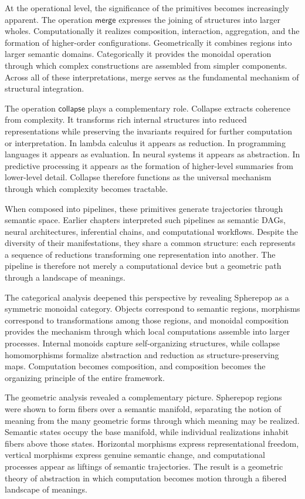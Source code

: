 \documentclass[12pt,letterpaper]{article}
\theoremstyle{remark}
\begin{document}
At the operational level, the significance of the primitives becomes increasingly apparent. The operation $\mathsf{merge}$ expresses the joining of structures into larger wholes. Computationally it realizes composition, interaction, aggregation, and the formation of higher-order configurations. Geometrically it combines regions into larger semantic domains. Categorically it provides the monoidal operation through which complex constructions are assembled from simpler components. Across all of these interpretations, merge serves as the fundamental mechanism of structural integration.

The operation $\mathsf{collapse}$ plays a complementary role. Collapse extracts coherence from complexity. It transforms rich internal structures into reduced representations while preserving the invariants required for further computation or interpretation. In lambda calculus it appears as reduction. In programming languages it appears as evaluation. In neural systems it appears as abstraction. In predictive processing it appears as the formation of higher-level summaries from lower-level detail. Collapse therefore functions as the universal mechanism through which complexity becomes tractable.

When composed into pipelines, these primitives generate trajectories through semantic space. Earlier chapters interpreted such pipelines as semantic DAGs, neural architectures, inferential chains, and computational workflows. Despite the diversity of their manifestations, they share a common structure: each represents a sequence of reductions transforming one representation into another. The pipeline is therefore not merely a computational device but a geometric path through a landscape of meanings.

The categorical analysis deepened this perspective by revealing Spherepop as a symmetric monoidal category. Objects correspond to semantic regions, morphisms correspond to transformations among those regions, and monoidal composition provides the mechanism through which local computations assemble into larger processes. Internal monoids capture self-organizing structures, while collapse homomorphisms formalize abstraction and reduction as structure-preserving maps. Computation becomes composition, and composition becomes the organizing principle of the entire framework.

The geometric analysis revealed a complementary picture. Spherepop regions were shown to form fibers over a semantic manifold, separating the notion of meaning from the many geometric forms through which meaning may be realized. Semantic states occupy the base manifold, while individual realizations inhabit fibers above those states. Horizontal morphisms express representational freedom, vertical morphisms express genuine semantic change, and computational processes appear as liftings of semantic trajectories. The result is a geometric theory of abstraction in which computation becomes motion through a fibered landscape of meanings.
\end{document}
